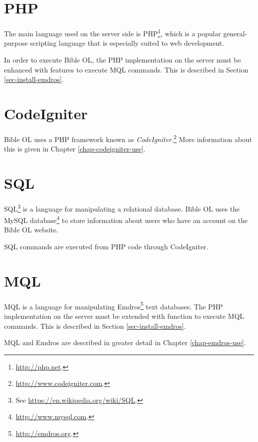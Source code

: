 \documentclass[11pt,oneside,a4paper]{memoir}
\begin{document}
\section{PHP}

The main language used on the server side is PHP\footnote{\url{http://php.net}.}, which is a popular
general-purpose scripting language that is especially suited to web development.

In order to execute Bible OL, the PHP implementation on the server must be enhanced with features to
execute MQL commands. This is described in Section \ref{sec-install-emdros}.

\section{CodeIgniter}\label{sec-codeigniter}

Bible OL uses a PHP framework known as \emph{CodeIgniter.}\footnote{\url{http://www.codeigniter.com}.}
More information about this is given in Chapter \ref{chap-codeigniter-use}.


\section{SQL}

SQL\footnote{See \url{https://en.wikipedia.org/wiki/SQL}.} is a language for manipulating a
relational database. Bible OL uses the MySQL database\footnote{\url{http://www.mysql.com}.} to store
information about users who have an account on the Bible OL website.

SQL commands are executed from PHP code through CodeIgniter.


\section{MQL}\label{sec-mql}

MQL is a language for manipulating Emdros\footnote{\url{http://emdros.org}.} text
databases. The PHP implementation on the server must be extended with function to execute MQL
commands. This is described in Section \ref{sec-install-emdros}.

MQL and Emdros are described in greater detail in Chapter \ref{chap-emdros-use}.
\end{document}
